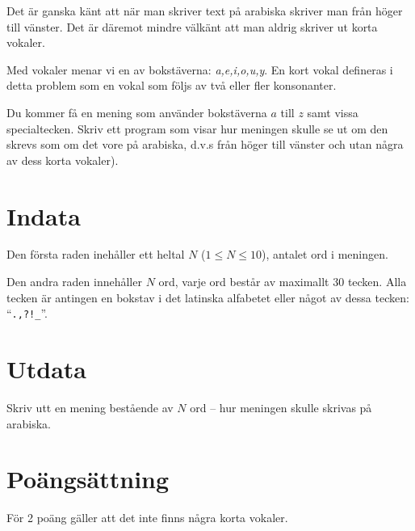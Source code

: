 Det är ganska känt att när man skriver text på arabiska skriver man från höger till vänster.
Det är däremot mindre välkänt att man aldrig skriver ut korta vokaler.

Med vokaler menar vi en av bokstäverna: \textit{a,e,i,o,u,y}.
En kort vokal defineras i detta problem som en vokal som följs av två eller fler konsonanter.

Du kommer få en mening som använder bokstäverna $a$ till $z$ samt vissa specialtecken.
Skriv ett program som visar hur meningen skulle se ut om den skrevs som om det vore på arabiska, d.v.s från höger till vänster och utan några av dess korta vokaler).

\section*{Indata}
Den första raden inehåller ett heltal $N$ ($1 \le N \le 10$), antalet ord i meningen.

Den andra raden innehåller $N$ ord, varje ord består av maximallt 30 tecken. Alla tecken är antingen en bokstav i det latinska alfabetet eller något av dessa tecken: ``\texttt{.,?!\_}''.

\section*{Utdata}
Skriv utt en mening bestående av $N$ ord -- hur meningen skulle skrivas på arabiska.

\section*{Poängsättning}
För 2 poäng gäller att det inte finns några korta vokaler. \\
